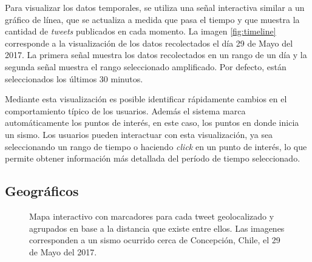 	
	Para visualizar los datos temporales, se utiliza una señal interactiva similar a un gráfico de línea, que se actualiza a medida que pasa el tiempo y que muestra la cantidad de \textit{tweets} publicados en cada momento.
	La imagen \ref{fig:timeline} corresponde a la visualización de los datos recolectados el día 29 de Mayo del 2017.
	La primera señal muestra los datos recolectados en un rango de un día y la segunda señal muestra el rango seleccionado amplificado. Por defecto, están seleccionados los últimos 30 minutos.
		
	Mediante esta visualización es posible identificar rápidamente cambios en el comportamiento típico de los usuarios.
	Además el sistema marca automáticamente los puntos de interés, en este caso, los puntos en donde inicia un sismo. 
	Los usuarios pueden interactuar con esta visualización, ya sea seleccionando un rango de tiempo o haciendo \textit{click} en un punto de interés, lo que permite obtener información más detallada del período de tiempo seleccionado. 
	
	
	\subsection{Geográficos}
	
	\begin{figure}[ht]
	\centering
	\hfill
  	\caption{Mapa interactivo con marcadores para cada tweet geolocalizado y agrupados en base a la distancia que existe entre ellos. Las imagenes corresponden a un sismo ocurrido cerca de  Concepción, Chile, el 29 de Mayo del 2017.}
  	\label{fig:worldmap}
  	\end{figure}
	 	
